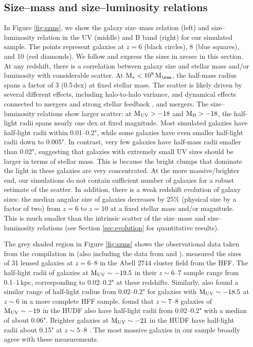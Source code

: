 \documentclass[useAMS,usenatbib]{mn2e}
\newcommand{\Ms}{{\rm M}_{\ast}}
\newcommand{\Msun}{{\rm M}_{\sun}}
\begin{document}
\subsection{Size--mass and size--luminosity relations}
\label{sec:szms}
In Figure \ref{fig:szms}, we show the galaxy size--mass relation (left) and size--luminosity relation in the UV (middle) and B band (right) for our simulated sample. The points represent galaxies at $z=6$ (black circles), 8 (blue squares), and 10 (red diamonds). We follow \citet{bouwens.2017:small.galaxy.sizes} and express the sizes in arcsec in this section.  At any redshift, there is a correlation between galaxy size and stellar mass and/or luminosity with considerable scatter. At $\Ms<10^8\,\Msun$, the half-mass radius spans a factor of 3 (0.5\,dex) at fixed stellar mass. The scatter is likely driven by several different effects, including halo-to-halo variance, and dynamical effects connected to mergers and strong stellar feedback \citep{elbadry.2016:fire.migration}, and mergers. The size--luminosity relations show larger scatter: at $\rm M_{UV}>-18$ and $\rm M_B>-18$, the half-light radii spans nearly one dex at fixed magnitude. Most simulated galaxies have half-light radii within 0.01--0.2", while some galaxies have even smaller half-light radii down to 0.005". In contrast, very few galaxies have half-mass radii smaller than 0.02", suggesting that galaxies with extremely small UV sizes should be larger in terms of stellar mass. This is because the bright clumps that dominate the light in these galaxies are very concentrated. At the more massive/brighter end, our simulations do not contain sufficient number of galaxies for a robust estimate of the scatter. In addition, there is a weak redshift evolution of galaxy sizes: the median angular size of galaxies decreases by 25\% (physical size by a factor of two) from $z=6$ to $z=10$ at a fixed stellar mass and/or magnitude. This is much smaller than the intrinsic scatter of the size--mass and size--luminosity relations (see Section \ref{sec:evolution} for quantitative results).

The grey shaded region in Figure \ref{fig:szms} shows the observational data taken from the compilation in \citet{bouwens.2017:small.galaxy.sizes} (also including the data from \citealt{ono.2013:size.evolution.udf12} and \citealt{kawamata.2015:hff.size.z6to8}). \citet{kawamata.2015:hff.size.z6to8} measured the sizes of 31 lensed galaxies at $z=6$--8 in the Abell 2744 cluster field from the HFF. The half-light radii of galaxies at $\rm M_{UV}\sim-19.5$ in their $z\sim6$--7 sample range from 0.1--1\,kpc, corresponding to 0.02--0.2" at these redshifts. Similarly, \citet{bouwens.2017:small.galaxy.sizes} also found a similar range of half-light radius from 0.02--0.2" for galaxies with $\rm M_{UV}\sim-18.5$ at $z\sim6$ in a more complete HFF sample. \citet{ono.2013:size.evolution.udf12} found that $z\sim7$--8 galaxies of $\rm M_{UV}\sim-19$ in the HUDF also have half-light radii from 0.02--0.2" with a median of about 0.06". Brighter galaxies at $\rm M_{UV}\sim-21$ in the HUDF have half-light radii about 0.15" at $z\sim5$--8 \citep[e.g.][]{bouwens.2004:hudf.size.evolution,oesch.2010:hudf.morphology}. The most massive galaxies in our sample broadly agree with these measurements.
\end{document}
